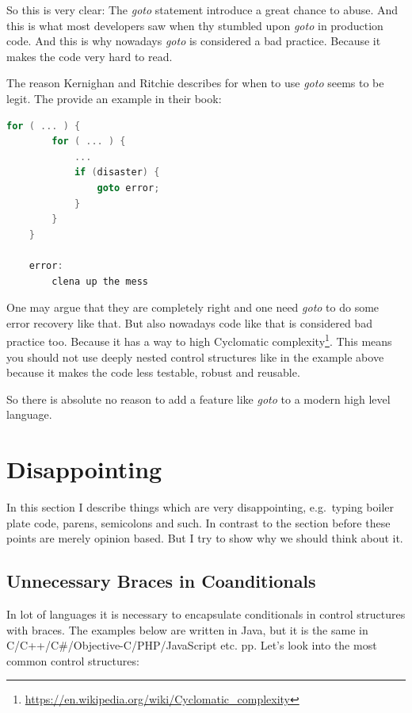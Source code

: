 \documentclass[11pt, a4paper]{report}
\begin{document}
So this is very clear: The \textit{goto} statement introduce a great chance to abuse. And this is what most developers saw when thy stumbled upon \textit{goto} in production code. And this is why nowadays \textit{goto} is considered a bad practice. Because it makes the code very hard to read. 

The reason Kernighan and Ritchie describes for when to use \textit{goto} seems to be legit. The provide an example in their book\cite{c-programming-lang}:

\begin{lstlisting}[language=C]
    for ( ... ) {
        for ( ... ) {
            ...
            if (disaster) {
                goto error;
            }
        }
    }
    
    error:
        clena up the mess
\end{lstlisting}

One may argue that they are completely right and one need \textit{goto} to do some error recovery like that. But also nowadays code like that is considered bad practice too. Because it has a way to high Cyclomatic complexity\footnote{\url{https://en.wikipedia.org/wiki/Cyclomatic_complexity}}. This means you should not use deeply nested control structures like in the example above because it makes the code less testable, robust and reusable.

So there is absolute no reason to add a feature like \textit{goto} to a modern high level language.

\section{Disappointing}

In this section I describe things which are very disappointing, e.g.\ typing boiler plate code, parens, semicolons and such. In contrast to the section before these points are merely opinion based. But I try to show why we should think about it.

\subsection{Unnecessary Braces in Coanditionals}

In lot of languages it is necessary to encapsulate conditionals in control structures with braces. The examples below are written in Java, but it is the same in C/C++/C\#/Objective-C/PHP/JavaScript etc. pp. Let's look into the most common control structures:
\end{document}

